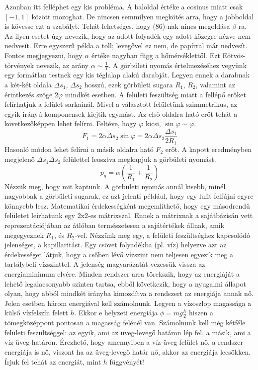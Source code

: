 \documentclass[a4paper,12pt]{article}
\begin{document}
Azonban itt felléphet egy kis probléma. A baloldal értéke a cosinus miatt csak $[-1,1]$ között mozoghat. De nincsen semmilyen megkötés arra, hogy a jobboldal is kövesse ezt a szabályt. Tehát lehetséges, hogy (86)-nak nincs megoldása $\beta$-ra. Az ilyen esetet úgy nevezik, hogy az adott folyadék egy adott közegre nézve nem nedvesít. Erre egyszerű példa a toll; levegővel ez nem, de papírral már nedvesít. Fontos megjegyezni, hogy $\alpha$ értéke nagyban függ a hőmérséklettől. Ezt Eötvös-törvények nevezik, az arány $\alpha\sim\frac{1}{T}$.
A görbületi nyomás értelmezéséhez vegyünk egy formátlan testnek egy kis téglalap alakú darabját. Legyen ennek a darabnak a két-két oldala $\Delta s_1$, $\Delta s_2$ hosszú, ezek görbületi sugara $R_1$, $R_2$, valamint az érintkezés szöge $2\varphi$ mindkét esetben. A felületi feszültség miatt a fellépő erőket felírhatjuk a felület sarkainál. Mivel a választott felületünk szimmetrikus, az egyik irányú komponensek kiejtik egymást. Az első oldalra ható erőt tehát a következőképpen lehet felírni. Feltéve, hogy $\varphi$ kicsi, $\sin\varphi\sim\varphi$.
\begin{equation}
F_1=2\alpha\Delta s_2\sin\varphi=2\alpha\Delta s_2\frac{\Delta s_1}{2R_1}
\end{equation}
Hasonló módon lehet felírni a másik oldalra ható $F_2$ erőt. A kapott eredményben megjelenő $\Delta s_1\Delta s_2$ felülettel leosztva megkapjuk a görbületi nyomást.
\begin{equation}
p_g=\alpha\left(\frac{1}{R_1}+\frac{1}{R_2}\right)
\end{equation}
Nézzük meg, hogy mit kaptunk. A görbületi nyomás annál kisebb, minél nagyobbak a görbületi sugarak, ez azt jelenti például, hogy egy lufit felfújni egyre könnyebb lesz. Matematikai érdekességként megemlíthető, hogy egy másodrendű felületet leírhatunk egy 2x2-es mátrixszal. Ennek a mátrixnak a sajátbázisán vett reprezentációjában az átlóban természetesen a sajátértékek állnak, amik megegyeznek $R_1$, és $R_2$-vel.
Nézzünk meg egy, a felületi feszültséghez kapcsolódó jelenséget, a kapillaritást. Egy csövet folyadékba (pl. víz) helyezve azt az érdekességet látjuk, hogy a csőben lévő vízszint nem teljesen egyezik meg a tartálybeli vízszinttel. A jelenség magyarázatát vezessük vissza az energiaminimum elvére. Minden rendszer arra törekszik, hogy az energiáját a lehető legalacsonyabb szinten tartsa, ebből következik, hogy a nyugalmi állapot olyan, hogy abból mindkét irányba kimozdítva a rendszert az energiája annak nő. Jelen esetben három energiával kell számolnunk. Legyen a vízoszlop magassága a külső vízfelszín felett $h$. Ekkor e helyzeti energiája $\phi=mg\frac{h}{2}$ hiszen a tömegközéppont pontosan a magasság felénél van. Számolnunk kell még kétféle felületi feszültséggel: az egyik, ami az üveg-levegő határon lép fel, a másik, ami a víz-üveg határon. Érezhető, hogy amennyiben a víz-üveg felület nő, a rendszer energiája is nő, viszont ha az üveg-levegő határ nő, akkor az energiája lecsökken. Írjuk fel tehát az energiát, mint $h$ függvényét!
\end{document}
